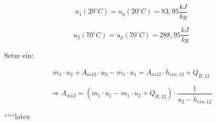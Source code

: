 \begin{equation}
u_1 (20^\circ C) = u_p(20^\circ C) = 83,95 \frac{kJ}{kg}
\end{equation}

\begin{equation}
u_2 (70^\circ C) = u_p(70^\circ C) = 288,95 \frac{kJ}{kg}
\end{equation}

Setze ein:

\begin{equation}
m_1 \cdot u_2 + A_{m12} \cdot u_2 - m_1 \cdot u_1 = A_{m12} \cdot \dot{h}_{ein,12} + Q_{R,12}
\end{equation}

\begin{equation}
\Rightarrow A_{m12} = \left( m_1 \cdot u_1 - m_1 \cdot u_2 + Q_{R,12} \right) \cdot \frac{1}{u_2 - \dot{h}_{ein,12}}
\end{equation}

``````latex


